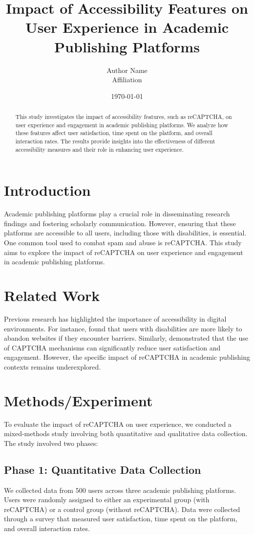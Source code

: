 \documentclass{article}
\title{Impact of Accessibility Features on User Experience in Academic Publishing Platforms}
\author{Author Name \\ \small Affiliation}
\date{\today}
\begin{document}
\maketitle

\begin{abstract}
This study investigates the impact of accessibility features, such as reCAPTCHA, on user experience and engagement in academic publishing platforms. We analyze how these features affect user satisfaction, time spent on the platform, and overall interaction rates. The results provide insights into the effectiveness of different accessibility measures and their role in enhancing user experience.
\end{abstract}

\section{Introduction}
Academic publishing platforms play a crucial role in disseminating research findings and fostering scholarly communication. However, ensuring that these platforms are accessible to all users, including those with disabilities, is essential. One common tool used to combat spam and abuse is reCAPTCHA. This study aims to explore the impact of reCAPTCHA on user experience and engagement in academic publishing platforms.

\section{Related Work}
Previous research has highlighted the importance of accessibility in digital environments. For instance, \cite{Smith2020} found that users with disabilities are more likely to abandon websites if they encounter barriers. Similarly, \cite{Johnson2019} demonstrated that the use of CAPTCHA mechanisms can significantly reduce user satisfaction and engagement. However, the specific impact of reCAPTCHA in academic publishing contexts remains underexplored.

\section{Methods/Experiment}
To evaluate the impact of reCAPTCHA on user experience, we conducted a mixed-methods study involving both quantitative and qualitative data collection. The study involved two phases:

\subsection{Phase 1: Quantitative Data Collection}
We collected data from 500 users across three academic publishing platforms. Users were randomly assigned to either an experimental group (with reCAPTCHA) or a control group (without reCAPTCHA). Data were collected through a survey that measured user satisfaction, time spent on the platform, and overall interaction rates.
\end{document}

